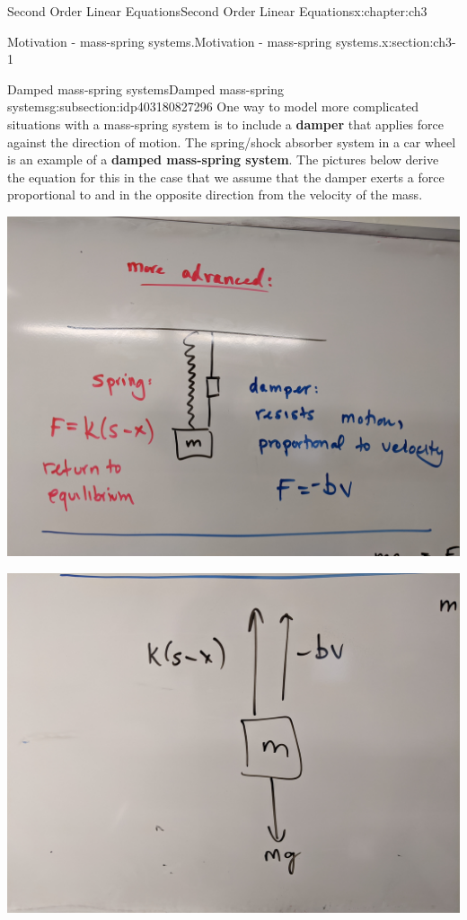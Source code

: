 \documentclass[oneside,10pt,]{book}
\newcommand{\terminology}[1]{\textbf{#1}}
\numberwithin{equation}{section}
\numberwithin{equation}{section}
\begin{document}
\begin{chapterptx}{Second Order Linear Equations}{}{Second Order Linear Equations}{}{}{x:chapter:ch3}
\begin{sectionptx}{Motivation - mass-spring systems.}{}{Motivation - mass-spring systems.}{}{}{x:section:ch3-1}
%
\begin{subsectionptx}{Damped mass-spring systems}{}{Damped mass-spring systems}{}{}{g:subsection:idp403180827296}
One way to model more complicated situations with a mass-spring system is to include a \terminology{damper} that applies force against the direction of motion. The spring\slash{}shock absorber system in a car wheel is an example of a \terminology{damped mass-spring system}. The pictures below derive the equation for this in the case that we assume that the damper exerts a force proportional to and in the opposite direction from the velocity of the mass.%
\begin{image}{0}{1}{0}%
\includegraphics[width=\linewidth]{images/damped1.jpg}
\end{image}%
\begin{image}{0}{1}{0}%
\includegraphics[width=\linewidth]{images/damped2.jpg}

\end{image}
\end{subsectionptx}
\end{sectionptx}
\end{chapterptx}
\end{document}
